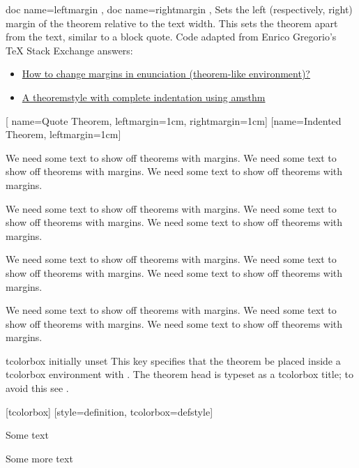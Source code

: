 \documentclass{ltxdoc}
\begin{document}
\begin{docKeys}[doc parameter={=\meta{length}}]
  {
    { doc name=leftmargin },
    { doc name=rightmargin },
  }
Sets the left (respectively, right) margin of the theorem relative to the text width.
This sets the theorem apart from the text, similar to a block quote. Code adapted from Enrico Gregorio's \TeX{} Stack Exchange answers:
\begin{itemize}
	\item \href{https://tex.stackexchange.com/a/67251/208544}{How to change margins in enunciation (theorem-like environment)?}
	\item \href{https://tex.stackexchange.com/a/236407/208544}{A theoremstyle with complete indentation using amsthm}
\end{itemize}
\begin{tcbwritetemp}
\newcommand{\marginthmtext}{%
  We need some text to show off theorems with margins. }
[
  name=Quote Theorem,
  leftmargin=1cm, rightmargin=1cm]
[name=Indented Theorem, leftmargin=1cm]
\end{tcbwritetemp}

\newcommand{\marginthmtext}{We need some text to show off theorems with margins. }
\begin{keythmscode}[withpreamble]
\marginthmtext\marginthmtext\marginthmtext

\begin{quotethm}
\marginthmtext\marginthmtext\marginthmtext
\end{quotethm}

\marginthmtext\marginthmtext\marginthmtext

\begin{indentedthm}
\marginthmtext\marginthmtext\marginthmtext
\end{indentedthm}
\end{keythmscode}

\end{docKeys}

\begin{docKey}{tcolorbox}
  {}
  {initially unset}
This key specifies that the theorem be placed inside a tcolorbox environment with .
The theorem head is typeset as a tcolorbox title; to avoid this see .

\begin{tcbwritetemp}
[tcolorbox]
[style=definition, tcolorbox={defstyle}]
\end{tcbwritetemp}

\begin{keythmscode}[withpreamble]
\begin{corollary}
Some text
\end{corollary}
\begin{definition}
Some more text
\end{definition}
\end{keythmscode}

\end{docKey}
\end{document}
